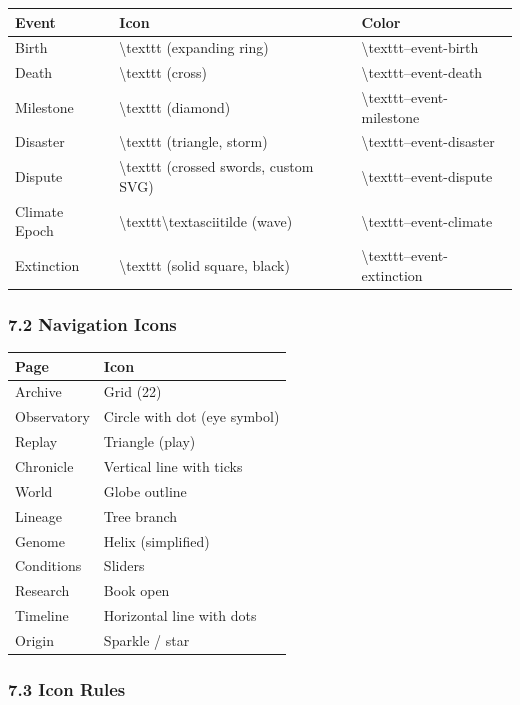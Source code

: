 \documentclass[11pt,a4paper]{article}
\begin{document}
\begin{longtable}{lll}
\toprule
Event & Icon & Color \\
\midrule
\endhead
Birth & \textbackslash{}texttt{} (expanding ring) & \textbackslash{}texttt{--event-birth} \\
Death & \textbackslash{}texttt{} (cross) & \textbackslash{}texttt{--event-death} \\
Milestone & \textbackslash{}texttt{} (diamond) & \textbackslash{}texttt{--event-milestone} \\
Disaster & \textbackslash{}texttt{} (triangle, storm) & \textbackslash{}texttt{--event-disaster} \\
Dispute & \textbackslash{}texttt{} (crossed swords, custom SVG) & \textbackslash{}texttt{--event-dispute} \\
Climate Epoch & \textbackslash{}texttt{\textbackslash{}textasciitilde{}} (wave) & \textbackslash{}texttt{--event-climate} \\
Extinction & \textbackslash{}texttt{} (solid square, black) & \textbackslash{}texttt{--event-extinction} \\
\bottomrule
\end{longtable}

\subsubsection*{7.2 Navigation Icons}

\begin{longtable}{ll}
\toprule
Page & Icon \\
\midrule
\endhead
Archive & Grid (22) \\
Observatory & Circle with dot (eye symbol) \\
Replay & Triangle (play) \\
Chronicle & Vertical line with ticks \\
World & Globe outline \\
Lineage & Tree branch \\
Genome & Helix (simplified) \\
Conditions & Sliders \\
Research & Book open \\
Timeline & Horizontal line with dots \\
Origin & Sparkle / star \\
\bottomrule
\end{longtable}

\subsubsection*{7.3 Icon Rules}
\end{document}
